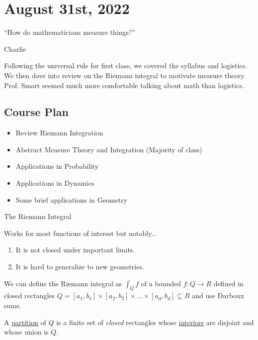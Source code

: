 \section{August 31st, 2022}

\epigraph{``How do mathematicians measure things?''}{Charlie}

Following the universal rule for first class, we covered the syllabus and logistics. We then dove into review on the Riemann integral to motivate measure theory. Prof. Smart seemed much more comfortable talking about math than logistics.

\subsection{Course Plan}
\begin{itemize}
	\item Review Riemann Integration
	\item Abstract Measure Theory and Integration (Majority of class)
	\item Applications in Probability
	\item Applications in Dynamics
	\item Some brief applications in Geometry
\end{itemize}

\begin{problem} The Riemann Integral
\item Works for most functions of interest but notably...
	\begin{enumerate}
		\item It is not closed under important limits.
		\item It is hard to generalize to new geometries.
	\end{enumerate}
\end{problem}

\begin{definition}
	We can define the Riemann integral as $\int_{{Q}}^{{}} {f}$ of a bounded $f : Q \to R$
	defined in closed rectangles
	$Q = [a_1,b_1] \times [a_2,b_2] \times \ldots \times [a_d,b_d] \subseteq R$ and use Darboux sums.
\end{definition}

\begin{definition}[Partition]
	A \underline{partition} of $Q$ is a finite set of \emph{closed} rectangles whose \underline{interiors} are disjoint and whose union is $Q$.
\end{definition}

